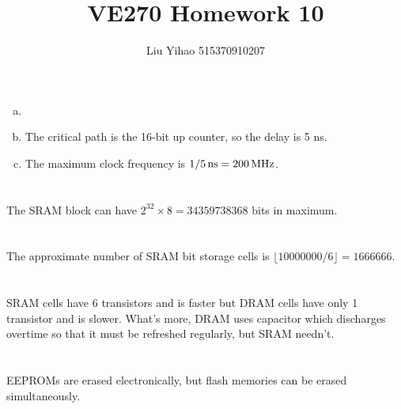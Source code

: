 \documentclass{article}
\title{VE270 Homework 10}
\author{Liu Yihao 515370910207}
\date{}
\newcommand{\unit}[1]{{\rm\,#1}}
\begin{document}
\maketitle

\section{}
\begin{enumerate}[(a)]
\item

\item
The critical path is the 16-bit up counter, so the delay is 5 ns.
\item
The maximum clock frequency is $1/5\unit{ns}=200\unit{MHz}$.
\end{enumerate}

\section{}
The SRAM block can have $2^{32}\times8=34359738368$ bits in maximum.

\section{}
The approximate number of SRAM bit storage cells is $\lfloor 10000000/6 \rfloor=1666666$.

\section{}
SRAM cells have 6 transistors and is faster but DRAM cells have only 1 transistor and is slower. What's more, DRAM uses capacitor which discharges overtime so that it must be refreshed regularly, but SRAM needn't.

\section{}
EEPROMs are erased electronically, but flash memories can be erased simultaneously.

\section{}
 
\end{document}
